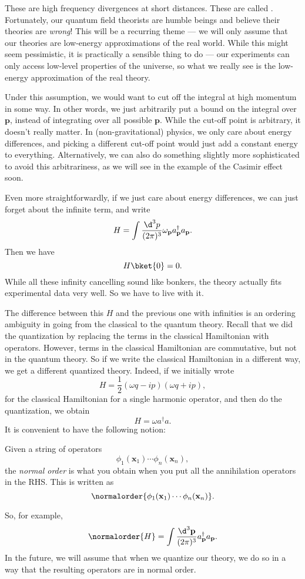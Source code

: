 \documentclass[a4paper]{article}
\begin{document}
These are high frequency divergences at short distances. These are called . Fortunately, our quantum field theorists are humble beings and believe their theories are \emph{wrong}! This will be a recurring theme --- we will only assume that our theories are low-energy approximations of the real world. While this might seem pessimistic, it is practically a sensible thing to do --- our experiments can only access low-level properties of the universe, so what we really see is the low-energy approximation of the real theory.

Under this assumption, we would want to cut off the integral at high momentum in some way. In other words, we just arbitrarily put a bound on the integral over $\mathbf{p}$, instead of integrating over all possible $\mathbf{p}$. While the cut-off point is arbitrary, it doesn't really matter. In (non-gravitational) physics, we only care about energy differences, and picking a different cut-off point would just add a constant energy to everything. Alternatively, we can also do something slightly more sophisticated to avoid this arbitrariness, as we will see in the example of the Casimir effect soon.

Even more straightforwardly, if we just care about energy differences, we can just forget about the infinite term, and write
\[
  H = \int \frac{\d^3 p}{(2\pi)^3} \omega_\mathbf{p} a_\mathbf{p}^\dagger a_\mathbf{p}.
\]
Then we have
\[
  H \bket{0} = 0.
\]
While all these infinity cancelling sound like bonkers, the theory actually fits experimental data very well. So we have to live with it.

The difference between this $H$ and the previous one with infinities is an ordering ambiguity in going from the classical to the quantum theory. Recall that we did the quantization by replacing the terms in the classical Hamiltonian with operators. However, terms in the classical Hamiltonian are commutative, but not in the quantum theory. So if we write the classical Hamiltonian in a different way, we get a different quantized theory. Indeed, if we initially wrote
\[
  H = \frac{1}{2} (\omega q - ip)(\omega q + ip),
\]
for the classical Hamiltonian for a single harmonic operator, and then do the quantization, we obtain
\[
  H = \omega a^\dagger a.
\]
It is convenient to have the following notion:
\begin{defi}
  Given a string of operators
  \[
    \phi_1(\mathbf{x}_1) \cdots \phi_n(\mathbf{x}_n),
  \]
  the \emph{normal order} is what you obtain when you put all the annihilation operators in the RHS. This is written as
  \[
    \normalorder{\phi_1(\mathbf{x}_1) \cdots \phi_n(\mathbf{x}_n)}.
  \]
\end{defi}
So, for example,
\[
  \normalorder{H} = \int \frac{\d^3 \mathbf{p}}{(2\pi)^3} a_\mathbf{p}^\dagger a_\mathbf{p}.
\]
In the future, we will assume that when we quantize our theory, we do so in a way that the resulting operators are in normal order.
\end{document}
